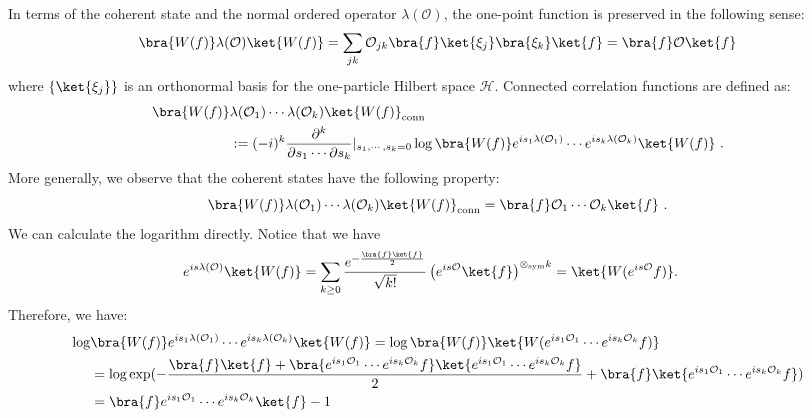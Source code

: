 \documentclass[a4paper,11pt]{article}
\theoremstyle{definition}
\numberwithin{equation}{section}
\newcommand{\lb}{\left(}
\newcommand{\rb}{\right)}
\begin{document}
In terms of the coherent state and the normal ordered operator $\lambda(\mathcal{O})$, the one-point function is preserved in the following sense:
\begin{equation}
    \bra{W(f)}\lambda(\mathcal{O})\ket{W(f)} = \sum_{jk}\mathcal{O}_{jk}\bra{f}\ket{\xi_j}\bra{\xi_k}\ket{f} = \bra{f}\mathcal{O}\ket{f}
\end{equation}
where $\{\ket{\xi_j}\}$ is an orthonormal basis for the one-particle Hilbert space $\mathcal{H}$. 
Connected correlation functions are defined as:
\begin{align}
    \begin{split}
        \bra{W(f)}&\lambda(\mathcal{O}_1)\cdots\lambda(\mathcal{O}_k)\ket{W(f)}_\text{conn} \\&:= (-i)^k\frac{\partial^k}{\partial s_1\cdots\partial s_k}|_{s_1,\cdots,s_k = 0}\log \bra{W(f)}e^{is_1\lambda(\mathcal{O}_1)}\cdots e^{is_k\lambda(\mathcal{O}_k)}\ket{W(f)}\ .
    \end{split}
\end{align}
More generally, we observe that the coherent states have the following property:
\begin{equation}
    \bra{W(f)}\lambda(\mathcal{O}_1)\cdots\lambda(\mathcal{O}_k)\ket{W(f)}_\text{conn} = \bra{f}\mathcal{O}_1\cdots \mathcal{O}_k\ket{f}\ .
\end{equation}
We can calculate the logarithm directly. Notice that we have
\begin{align}\label{equation:action}
    \begin{split}
        e^{is\lambda(\mathcal{O})}\ket{W(f)} &= \sum_{k\geq 0}\frac{e^{-\frac{\bra{f}\ket{f}}{2}}}{\sqrt{k!}}\lb e^{is\mathcal{O}}\ket{f}\rb^{\otimes_\text{sym} k}
         = \ket{W(e^{is\mathcal{O}}f)}.
    \end{split}
\end{align}
Therefore, we have:
\begin{align}
    \begin{split}
        \log&\bra{W(f)}e^{is_1\lambda(\mathcal{O}_1)}\cdots e^{is_k\lambda(\mathcal{O}_k)}\ket{W(f)} = \log\bra{W(f)}\ket{W(e^{is_1\mathcal{O}_1}\cdots e^{is_k\mathcal{O}_k}f)} \\&= \log \exp(-\frac{\bra{f}\ket{f} +\bra{e^{is_1\mathcal{O}_1}\cdots e^{is_k\mathcal{O}_k}f}\ket{e^{is_1\mathcal{O}_1}\cdots e^{is_k\mathcal{O}_k}f}}{2} + \bra{f}\ket{e^{is_1\mathcal{O}_1}\cdots e^{is_k\mathcal{O}_k}f})
        \\&
        =\bra{f}e^{is_1\mathcal{O}_1}\cdots e^{is_k\mathcal{O}_k}\ket{f} - 1
    \end{split}
\end{align}
\end{document}
